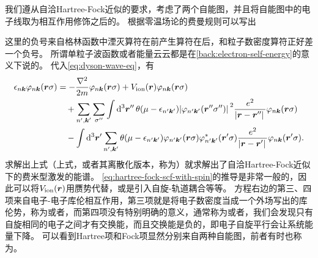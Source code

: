 我们遵从自洽Hartree-Fock近似的要求，考虑了两个自能图，并且将自能图中的电子线取为相互作用修饰之后的。
根据零温场论的费曼规则可以写出

这里的负号来自格林函数中湮灭算符在前产生算符在后，和粒子数密度算符正好差一个负号。
所谓单粒子波函数或者能量云云都是在\autoref{back:electron-self-energy}的意义下说的。
代入\eqref{eq:dyson-wave-eq}，有
\begin{equation}
    \begin{aligned}
        \epsilon_{n \vb*{k}} \varphi_{n \vb*{k}}(\vb*{r} \sigma) &= - \frac{\laplacian}{2m} \varphi_{n \vb*{k}}(\vb*{r} \sigma) + V_\text{ion}(\vb*{r}) \varphi_{n \vb*{k}}(\vb*{r} \sigma) \\
        &\quad +  \sum_{n', \vb*{k}'} \sum_{\sigma''} \int \dd[3]{\vb*{r}''} \theta(\mu - \epsilon_{n' \vb*{k}'}) \abs*{\varphi_{n' \vb*{k}'}(\vb*{r}'' \sigma'')}^2 \frac{e^2}{\abs*{\vb*{r} - \vb*{r}''}} \varphi_{n \vb*{k}}(\vb*{r} \sigma) \\
        &\quad - \int \dd[3]{\vb*{r}'} \sum_{n', \vb*{k}'} \theta(\mu - \epsilon_{n' \vb*{k}'}) \varphi_{n' \vb*{k}'}(\vb*{r} \sigma) \varphi^*_{n' \vb*{k}'}(\vb*{r}' \sigma) \frac{e^2}{\abs*{\vb*{r} - \vb*{r}'}} \varphi_{n \vb*{k}}(\vb*{r}' \sigma) .
    \end{aligned}
    \label{eq:hartree-fock-scf-with-spin}
\end{equation}
求解出上式（上式，或者其离散化版本，称为）就求解出了自洽Hartree-Fock近似下的费米型激发的能谱。
\eqref{eq:hartree-fock-scf-with-spin}的推导是非常一般的，因此可以将$V_\text{ion}(\vb*{r})$用赝势代替，或是引入自旋-轨道耦合等等。
方程右边的第三、四项来自电子-电子库伦相互作用，第三项就是将电子数密度当成一个外场写出的库伦势，称为或者，而第四项没有特别明确的意义，通常称为或者，我们会发现只有自旋相同的电子之间才有交换能，而且交换能是负的，即电子自旋平行会让系统能量下降。
可以看到Hartree项和Fock项显然分别来自两种自能图，前者有时也称为。

